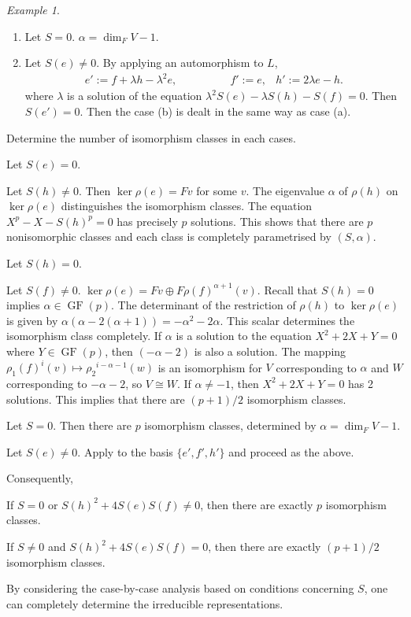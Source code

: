 \documentclass[12pt,MSc]{muthesis_2023}
\theoremstyle{plain}%
\theoremstyle{definition}
\theoremstyle{remark}
\newtheorem{Example}[FactCounter]{Example} %
\DeclareMathOperator{\GF}{GF}
\begin{document}
\begin{Example}
\begin{enumerate}
\item[(a.3)]
Let $S=0$. $\alpha=\dim_F V-1$.

\item[(b)] Let $S(e)\neq0$. By applying an automorphism to $L$,
\begin{align*}
e':= f+\lambda h-\lambda^2e, \quad\quad\quad\quad& f':=e, & h':=2\lambda e-h.
\end{align*}
where $\lambda$ is a solution of the equation $\lambda^2S(e)-\lambda S(h)-S(f)=0$. Then $S(e')=0$. Then the case (b) is dealt in the same way as case (a).
\end{enumerate}

Determine the number of isomorphism classes in each cases.

\item[(a)] Let $S(e)=0$.

\item[(a'.1)] Let $S(h)\neq0$. Then $\ker \rho(e)=Fv$ for some $v$. The eigenvalue $\alpha$ of $\rho(h)$ on $\ker \rho(e)$ distinguishes the isomorphism classes. The equation $X^p-X-{S(h)}^p=0$ has precisely $p$ solutions. This shows that there are $p$ nonisomorphic classes and each class is completely parametrised by $(S,\alpha)$.

\item[(a'.2)] Let $S(h)=0$.

\item[(a'.2.1)] Let $S(f)\neq0$. $\ker \rho(e)=Fv \oplus F{\rho(f)}^{\alpha+1}(v)$. Recall that $S(h)=0$ implies $\alpha \in \GF(p)$. The determinant of the restriction of $\rho(h)$ to $\ker\rho(e)$ is given by $\alpha(\alpha-2(\alpha+1))=-\alpha^2-2\alpha$. This scalar determines the isomorphism class completely. If $\alpha$ is a solution to the equation $X^2+2X+Y=0$ where $Y\in \GF(p)$, then $(-\alpha-2)$ is also a solution. The mapping ${\rho_1(f)}^i(v) \mapsto {\rho_2}^{i-\alpha-1}(w)$ is an isomorphism for $V$ corresponding to $\alpha$ and $W$ corresponding to $-\alpha-2$, so $V\cong W$. If $\alpha\neq -1$, then $X^2+2X+Y=0$ has 2 solutions. This implies that there are $(p+1)/2$ isomorphism classes.

\item[(a'.2.2)] Let $S=0$. Then there are $p$ isomorphism classes, determined by $\alpha=\dim_FV-1$.

\item[(b)] Let $S(e)\neq0$. Apply to the basis $\{e', f', h'\}$ and proceed as the above.

Consequently,
\item[(1)] If $S=0$ or ${S(h)}^2+4S(e)S(f)\neq0$, then there are exactly $p$ isomorphism classes.

\item[(2)] If $S\neq0$ and ${S(h)}^2+4S(e)S(f)=0$, then there are exactly $(p+1)/2$ isomorphism classes.

By considering the case-by-case analysis based on conditions concerning $S$, one can completely determine the irreducible representations.
\end{Example}
\end{document}
